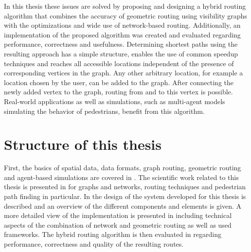 	In this thesis these issues are solved by proposing and designing a hybrid routing algorithm that combines the accuracy of geometric routing using visibility graphs with the optimizations and wide use of network-based routing.
	Additionally, an implementation of the proposed algorithm was created and evaluated regarding performance, correctness and usefulness.
	Determining shortest paths using the resulting approach has a simple structure, enables the use of common speedup techniques and reaches all accessible locations independent of the presence of corresponding vertices in the graph.
	Any other arbitrary location, for example a location chosen by the user, can be added to the graph.
	After connecting the newly added vertex to the graph, routing from and to this vertex is possible.
	Real-world applications as well as simulations, such as multi-agent models simulating the behavior of pedestrians, benefit from this algorithm.
	
\section{Structure of this thesis}

	First, the basics of spatial data, data formats, graph routing, geometric routing and agent-based simulations are covered in .
	The scientific work related to this thesis is presented in  for graphs and networks, routing techniques and pedestrian path finding in particular.
	In  the design of the system developed for this thesis is described and an overview of the different components and elements is given.
	A more detailed view of the implementation is presented in  including technical aspects of the combination of network and geometric routing as well as used frameworks.
	The hybrid routing algorithm is then evaluated in  regarding performance, correctness and quality of the resulting routes.
	
